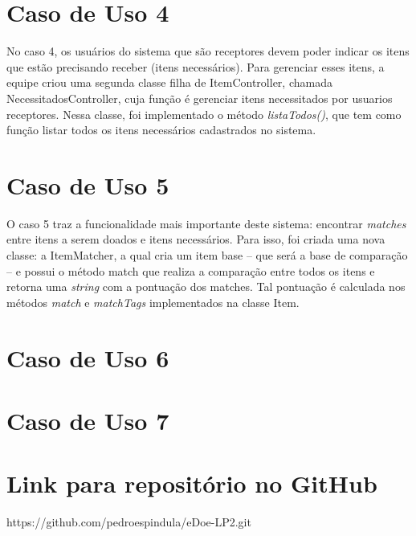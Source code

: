 \documentclass[journal,12pt,onecolumn,draftclsnofoot,]{article}
\begin{document}
	
	\section{Caso de Uso 4}
	No caso 4, os usuários do sistema que são receptores devem poder indicar os itens que estão precisando receber (itens necessários). Para gerenciar esses itens, a equipe criou uma segunda classe filha de ItemController, chamada NecessitadosController, cuja função é gerenciar itens necessitados por usuarios receptores. Nessa classe, foi implementado o método \textit{listaTodos()}, que tem como função listar todos os itens necessários cadastrados no sistema.
	
	\section{Caso de Uso 5}
	O caso 5 traz a funcionalidade mais importante deste sistema: encontrar \textit{matches} entre itens a serem doados e itens necessários. Para isso, foi criada uma nova classe: a ItemMatcher, a qual cria um item base -- que será a base de comparação -- e possui o método match que realiza a comparação entre todos os itens e retorna uma \textit{string} com a pontuação dos matches. Tal pontuação é calculada nos métodos \textit{match} e \textit{matchTags} implementados na classe Item.
	
	\section{Caso de Uso 6}

	
	\section{Caso de Uso 7}	
		
	
	\section{Link para repositório no GitHub}
	https://github.com/pedroespindula/eDoe-LP2.git
	
\end{document}
